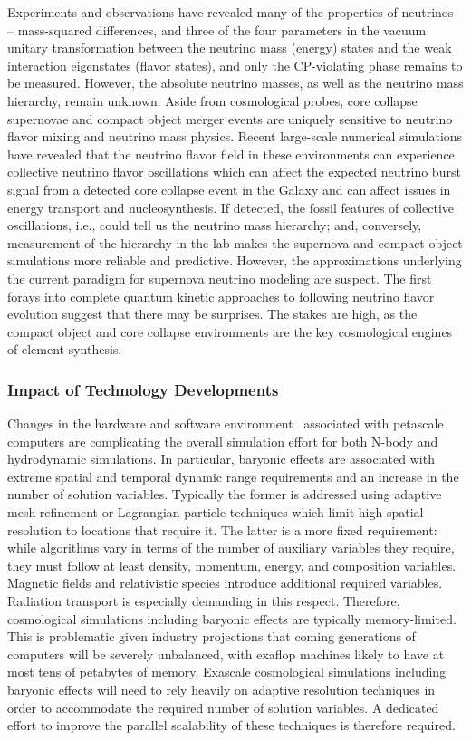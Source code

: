 Experiments and observations have revealed many of the properties of
neutrinos -- mass-squared differences, and three of the four
parameters in the vacuum unitary transformation between the neutrino
mass (energy) states and the weak interaction eigenstates (flavor
states), and only the CP-violating phase remains to be
measured. However, the absolute neutrino masses, as well as the
neutrino mass hierarchy, remain unknown. Aside from cosmological
probes, core collapse supernovae and compact object merger events are
uniquely sensitive to neutrino flavor mixing and neutrino mass
physics. Recent large-scale numerical simulations have revealed that
the neutrino flavor field in these environments can experience
collective neutrino flavor oscillations which can affect the expected
neutrino burst signal from a detected core collapse event in the
Galaxy and can affect issues in energy transport and
nucleosynthesis. If detected, the fossil features of collective
oscillations, i.e., could tell us the neutrino mass hierarchy; and,
conversely, measurement of the hierarchy in the lab makes the
supernova and compact object simulations more reliable and
predictive. However, the approximations underlying the current
paradigm for supernova neutrino modeling are suspect. The first forays
into complete quantum kinetic approaches to following neutrino flavor
evolution suggest that there may be surprises. The stakes are high, as
the compact object and core collapse environments are the key
cosmological engines of element synthesis.

\subsubsection{ Impact of Technology Developments}

Changes in the hardware and software environment~\cite{microproc}
associated with petascale computers are complicating the overall
simulation effort for both N-body and hydrodynamic simulations. In
particular, baryonic effects are associated with extreme spatial and
temporal dynamic range requirements and an increase in the number of
solution variables. Typically the former is addressed using adaptive
mesh refinement or Lagrangian particle techniques which limit high
spatial resolution to locations that require it. The latter is a more
fixed requirement: while algorithms vary in terms of the number of
auxiliary variables they require, they must follow at least density,
momentum, energy, and composition variables. Magnetic fields and
relativistic species introduce additional required
variables. Radiation transport is especially demanding in this
respect. Therefore, cosmological simulations including baryonic
effects are typically memory-limited. This is problematic given
industry projections that coming generations of computers will be
severely unbalanced, with exaflop machines likely to have at most tens
of petabytes of memory. Exascale cosmological simulations including
baryonic effects will need to rely heavily on adaptive resolution
techniques in order to accommodate the required number of solution
variables. A dedicated effort to improve the parallel scalability of
these techniques is therefore required.

